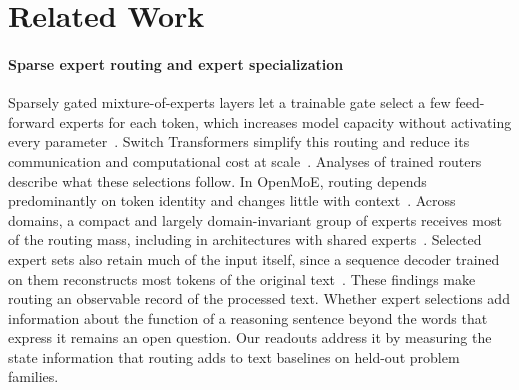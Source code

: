 \section{Related Work}
\label{sec:related-work}

\paragraph{Sparse expert routing and expert specialization}
Sparsely gated mixture-of-experts layers let a trainable gate select a few feed-forward experts for each token, which increases model capacity without activating every parameter~\citep{shazeer2017moe}.
%
Switch Transformers simplify this routing and reduce its communication and computational cost at scale~\citep{fedus2022switch}.
%
Analyses of trained routers describe what these selections follow.
%
In OpenMoE, routing depends predominantly on token identity and changes little with context~\citep{xue2024openmoe}.
%
Across domains, a compact and largely domain-invariant group of experts receives most of the routing mass, including in architectures with shared experts~\citep{wang2026illusion}.
%
Selected expert sets also retain much of the input itself, since a sequence decoder trained on them reconstructs most tokens of the original text~\citep{nuriyev2026selections}.
%
These findings make routing an observable record of the processed text.
%
Whether expert selections add information about the function of a reasoning sentence beyond the words that express it remains an open question.
%
Our readouts address it by measuring the state information that routing adds to text baselines on held-out problem families.
%

